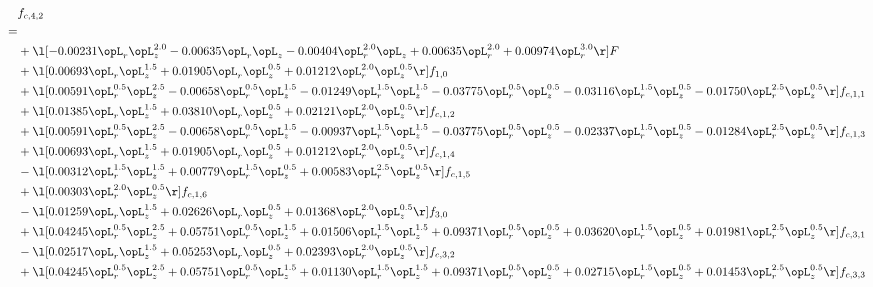 \begin{alignat}{2} 
\label{eq:f_42_1} 
& f_{c,4,2} \nonumber \\ 
 = \\ 
& + \l[  -0.00231 \opL_r \opL_z^{2.0}   -0.00635 \opL_r \opL_z   -0.00404 \opL_r^{2.0} \opL_z +  0.00635 \opL_r^{2.0} +  0.00974 \opL_r^{3.0}  \r] F \nonumber \\ 
& + \l[  0.00693 \opL_r \opL_z^{1.5} +  0.01905 \opL_r \opL_z^{0.5} +  0.01212 \opL_r^{2.0} \opL_z^{0.5}  \r] f_{1,0} \nonumber \\ 
& + \l[  0.00591 \opL_r^{0.5} \opL_z^{2.5}   -0.00658 \opL_r^{0.5} \opL_z^{1.5}   -0.01249 \opL_r^{1.5} \opL_z^{1.5}   -0.03775 \opL_r^{0.5} \opL_z^{0.5}   -0.03116 \opL_r^{1.5} \opL_z^{0.5}   -0.01750 \opL_r^{2.5} \opL_z^{0.5}  \r] f_{c,1,1} \nonumber \\ 
& + \l[  0.01385 \opL_r \opL_z^{1.5} +  0.03810 \opL_r \opL_z^{0.5} +  0.02121 \opL_r^{2.0} \opL_z^{0.5}  \r] f_{c,1,2} \nonumber \\ 
& + \l[  0.00591 \opL_r^{0.5} \opL_z^{2.5}   -0.00658 \opL_r^{0.5} \opL_z^{1.5}   -0.00937 \opL_r^{1.5} \opL_z^{1.5}   -0.03775 \opL_r^{0.5} \opL_z^{0.5}   -0.02337 \opL_r^{1.5} \opL_z^{0.5}   -0.01284 \opL_r^{2.5} \opL_z^{0.5}  \r] f_{c,1,3} \nonumber \\ 
& + \l[  0.00693 \opL_r \opL_z^{1.5} +  0.01905 \opL_r \opL_z^{0.5} +  0.01212 \opL_r^{2.0} \opL_z^{0.5}  \r] f_{c,1,4} \nonumber \\ 
& - \l[  0.00312 \opL_r^{1.5} \opL_z^{1.5} +  0.00779 \opL_r^{1.5} \opL_z^{0.5} +  0.00583 \opL_r^{2.5} \opL_z^{0.5}  \r] f_{c,1,5} \nonumber \\ 
& + \l[  0.00303 \opL_r^{2.0} \opL_z^{0.5}  \r] f_{c,1,6} \nonumber \\ 
& - \l[  0.01259 \opL_r \opL_z^{1.5} +  0.02626 \opL_r \opL_z^{0.5} +  0.01368 \opL_r^{2.0} \opL_z^{0.5}  \r] f_{3,0} \nonumber \\ 
& + \l[  0.04245 \opL_r^{0.5} \opL_z^{2.5} +  0.05751 \opL_r^{0.5} \opL_z^{1.5} +  0.01506 \opL_r^{1.5} \opL_z^{1.5} +  0.09371 \opL_r^{0.5} \opL_z^{0.5} +  0.03620 \opL_r^{1.5} \opL_z^{0.5} +  0.01981 \opL_r^{2.5} \opL_z^{0.5}  \r] f_{c,3,1} \nonumber \\ 
& - \l[  0.02517 \opL_r \opL_z^{1.5} +  0.05253 \opL_r \opL_z^{0.5} +  0.02393 \opL_r^{2.0} \opL_z^{0.5}  \r] f_{c,3,2} \nonumber \\ 
& + \l[  0.04245 \opL_r^{0.5} \opL_z^{2.5} +  0.05751 \opL_r^{0.5} \opL_z^{1.5} +  0.01130 \opL_r^{1.5} \opL_z^{1.5} +  0.09371 \opL_r^{0.5} \opL_z^{0.5} +  0.02715 \opL_r^{1.5} \opL_z^{0.5} +  0.01453 \opL_r^{2.5} \opL_z^{0.5}  \r] f_{c,3,3} \nonumber \\ 

\end{alignat}
